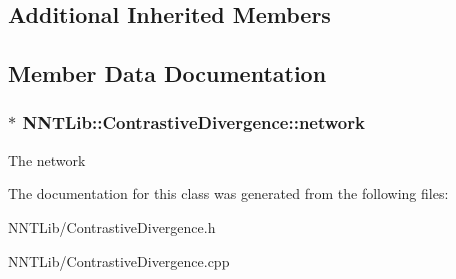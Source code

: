 \subsection*{Additional Inherited Members}


\subsection{Member Data Documentation}
\hypertarget{class_n_n_t_lib_1_1_contrastive_divergence_a922b07047f0dacb946fbbf3828484ad4}{}
\subsubsection[{network}]{$\ast$ N\+N\+T\+Lib\+::\+Contrastive\+Divergence\+::network}\label{class_n_n_t_lib_1_1_contrastive_divergence_a922b07047f0dacb946fbbf3828484ad4}


The network 



The documentation for this class was generated from the following files\+:\begin{DoxyCompactItemize}
\item 
N\+N\+T\+Lib/Contrastive\+Divergence.\+h\item 
N\+N\+T\+Lib/Contrastive\+Divergence.\+cpp\end{DoxyCompactItemize}
